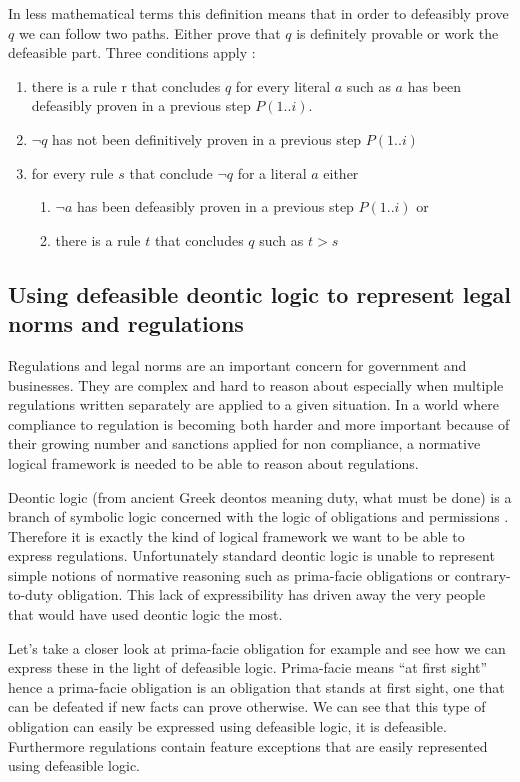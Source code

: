 \documentclass[10pt]{report}
\newcommand{\textgreek}[1]{\begingroup\fontencoding{LGR}\selectfont#1\endgroup} %
\begin{document}
In less mathematical terms this definition means that in order to defeasibly prove $q$ we can follow two paths. Either prove that $q$ is definitely provable or work the defeasible part. Three conditions apply :
\begin{enumerate}
\item there is a rule r that concludes $q$ for every literal $a$ such as $a$ has been defeasibly proven in a previous step $P(1..i)$.
\item $\neg q$ has not been definitively proven in a previous step $P(1..i)$
\item for every rule $s$ that conclude $\neg q$ for a literal $a$ either
  \begin{enumerate}
  \item $\neg a$ has been defeasibly proven in a previous step $P(1..i)$ or
  \item there is a rule $t$ that concludes $q$ such as $t>s$
  \end{enumerate}
\end{enumerate}


\subsection{Using defeasible deontic logic to represent legal norms and regulations}

Regulations and legal norms are an important concern for government and businesses. They are complex and hard to reason about especially when multiple regulations written separately are applied to a given situation. In a world where compliance to regulation is becoming both harder and more important because of their growing number and sanctions applied for non compliance, a normative logical framework is needed to be able to reason about regulations.

Deontic logic (from ancient Greek \textgreek{deontos} meaning duty, what must be done) is a branch of symbolic logic concerned with the logic of obligations and permissions \autocite{mcnamara_deontic_2010}. Therefore it is exactly the kind of logical framework we want to be able to express regulations. Unfortunately standard deontic logic is unable to represent simple notions of normative reasoning such as prima-facie obligations or contrary-to-duty obligation. This lack of expressibility has driven away the very people that would have used deontic logic the most\autocite{nute1997defeasible}.

Let's take a closer look at prima-facie obligation for example and see how we can express these in the light of defeasible logic. Prima-facie means \enquote{at first sight} hence a prima-facie obligation is an obligation that stands at first sight, one that can be defeated if new facts can prove otherwise. We can see that this type of obligation can easily be expressed using defeasible logic, it is defeasible. Furthermore regulations contain feature exceptions that are easily represented using defeasible logic.
\end{document}
